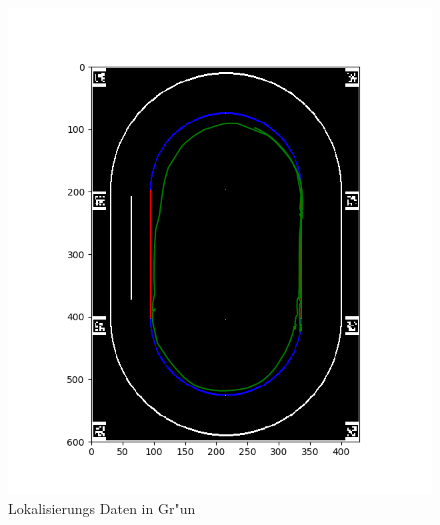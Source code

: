 \documentclass[10pt,oneside,a4paper]{article}
\begin{document}
    \begin{figure}[h]
      \centering
      \includegraphics[scale=0.9]{pictures/map_with_localization.png}
      \caption{Lokalisierungs Daten in Gr"un}
    \end{figure}
\end{document}
